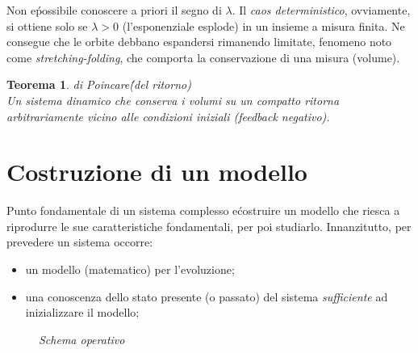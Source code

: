 \documentclass[12pt, a4paper]{book}
\theoremstyle{theorem}
\newtheorem{theorem}{Teorema}[section]
\begin{document}
			Non e\' possibile conoscere a priori il segno di $\lambda$.
			Il \emph{caos deterministico}, ovviamente, si ottiene solo se $\lambda>0$ (l'esponenziale esplode) in un insieme a misura finita.
			Ne consegue che le orbite debbano espandersi rimanendo limitate, fenomeno noto come \emph{stretching-folding}, che comporta la conservazione di una misura (volume).
			\begin{theorem}
				di Poincare\' (del ritorno)
				\\Un sistema dinamico che conserva i volumi su un compatto ritorna arbitrariamente vicino alle condizioni iniziali (feedback negativo).
				\label{theorem:poincare}
			\end{theorem}
		
		\section{Costruzione di un modello}
			Punto fondamentale di un sistema complesso e\' costruire un modello che riesca a riprodurre le sue caratteristiche fondamentali, per poi studiarlo.
			Innanzitutto, per prevedere un sistema occorre:
			\begin{itemize}
				\item un modello (matematico) per l'evoluzione;
				\item una conoscenza dello stato presente (o passato) del sistema \emph{sufficiente} ad inizializzare il modello;
			\end{itemize}
			\begin{figure}[H]
				\centering
				\caption{\emph{Schema operativo}}
				\label{figure:schema_operativo}
			\end{figure}
\end{document}
